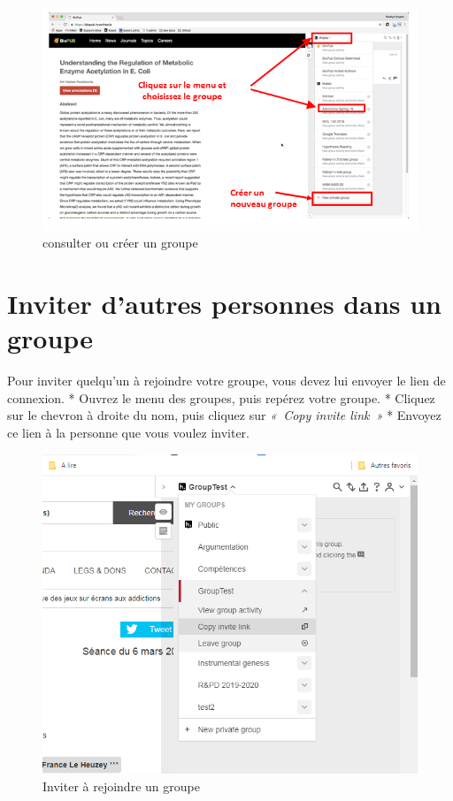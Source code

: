 \documentclass[
]{book}
\begin{document}
\begin{figure}
\centering
\includegraphics{img/groupes.png}
\caption{consulter ou créer un groupe}
\end{figure}

\hypertarget{s62}{%
\section{Inviter d'autres personnes dans un groupe}\label{s62}}

Pour inviter quelqu'un à rejoindre votre groupe, vous devez lui envoyer le lien de connexion.
* Ouvrez le menu des groupes, puis repérez votre groupe.
* Cliquez sur le chevron à droite du nom, puis cliquez sur \emph{«~Copy invite link~»}
* Envoyez ce lien à la personne que vous voulez inviter.

\begin{figure}
\centering
\includegraphics{img/10545b5bdaaf92692913d7f2ab400691.png}
\caption{Inviter à rejoindre un groupe}
\end{figure}
\end{document}
